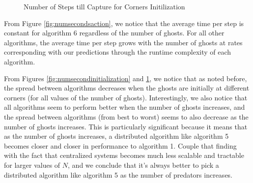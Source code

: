 \documentclass[11pt]{article}
\begin{document}
\begin{figure}[H]
	\caption{Number of Steps till Capture for Corners Initilization}
	\label{fig:numberstepscornerscore}
\end{figure}


\begin{multicols}{2}

From Figure \ref{fig:numsecondsaction}, we notice that the average time per step is constant for algorithm 6 regardless of the number of ghosts. For all other algorithms, the average time per step grows with the number of ghosts at rates corresponding with our predictions through the runtime complexity of each algorithm.

From Figures \ref{fig:numsecondinitialization} and \ref{fig:numberstepscornerscore}, we notice that as noted before, the spread between algorithms decreases when the ghosts are initially at different corners (for all values of the number of ghosts). Interestingly, we also notice that all algorithms seem to perform better when the number of ghosts increases, and the spread between algorithms (from best to worst) seems to also decrease as the number of ghosts increases. This is particularly significant because it means that as the number of ghosts increases, a distributed algorithm like algorithm 5 becomes closer and closer in performance to algorithm 1. Couple that finding with the fact that centralized systems becomes much less scalable and tractable for larger values of $N$, and we conclude that it's always better to pick a distributed algorithm like algorithm 5 as the number of predators increases.


\end{multicols}
\end{document}
